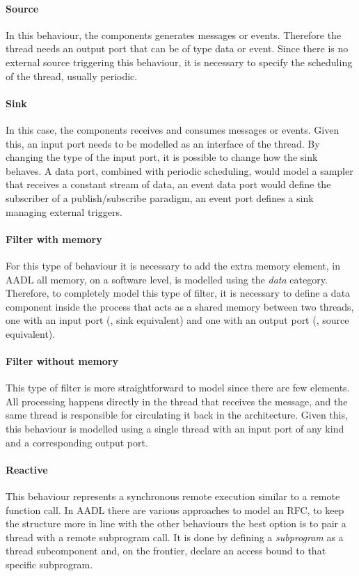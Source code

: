 \paragraph{Source} In this behaviour, the components generates messages or events. Therefore the thread needs an output port that can be of type data or event. Since there is no external source triggering this behaviour, it is necessary to specify the scheduling of the thread, usually periodic.
\paragraph{Sink} In this case, the components receives and consumes messages or events. Given this, an input port needs to be modelled as an interface of the thread. By changing the type of the input port, it is possible to change how the sink behaves. A data port, combined with periodic scheduling, would model a sampler that receives a constant stream of data, an event data port would define the subscriber of a publish/subscribe paradigm, an event port defines a sink managing external triggers.
\paragraph{Filter with memory} For this type of behaviour it is necessary to add the extra memory element, in AADL all memory, on a software level, is modelled using the \textit{data} category. Therefore, to completely model this type of filter, it is necessary to define a data component inside the process that acts as a shared memory between two threads, one with an input port (\ie, sink equivalent) and one with an output port (\ie, source equivalent).
\paragraph{Filter without memory} This type of filter is more straightforward to model since there are few elements. All processing happens directly in the thread that receives the message, and the same thread is responsible for circulating it back in the architecture. Given this, this behaviour is modelled using a single thread with an input port of any kind and a corresponding output port.
\paragraph{Reactive} This behaviour represents a synchronous remote execution similar to a remote function call. In AADL there are various approaches to model an RFC, to keep the structure more in line with the other behaviours the best option is to pair a thread with a remote subprogram call. It is done by defining a \textit{subprogram} as a thread subcomponent and, on the frontier, declare an access bound to that specific subprogram.

